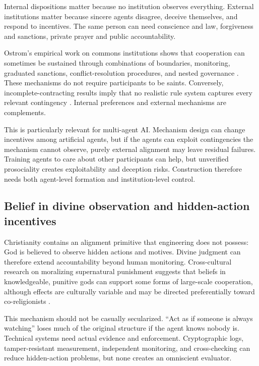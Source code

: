 \documentclass[11pt]{article}
\begin{document}
Internal dispositions matter because no institution observes everything. External institutions matter because sincere agents disagree, deceive themselves, and respond to incentives. The same person can need conscience and law, forgiveness and sanctions, private prayer and public accountability.

Ostrom's empirical work on commons institutions shows that cooperation can sometimes be sustained through combinations of boundaries, monitoring, graduated sanctions, conflict-resolution procedures, and nested governance \parencite{ostrom1990commons}. These mechanisms do not require participants to be saints. Conversely, incomplete-contracting results imply that no realistic rule system captures every relevant contingency \parencite{hadfieldmenell2019incomplete,huang2026mechanism}. Internal preferences and external mechanisms are complements.

This is particularly relevant for multi-agent AI. Mechanism design can change incentives among artificial agents, but if the agents can exploit contingencies the mechanism cannot observe, purely external alignment may leave residual failures. Training agents to care about other participants can help, but unverified prosociality creates exploitability and deception risks. Construction therefore needs both agent-level formation and institution-level control.

\subsection{Belief in divine observation and hidden-action incentives}

Christianity contains an alignment primitive that engineering does not possess: God is believed to observe hidden actions and motives. Divine judgment can therefore extend accountability beyond human monitoring. Cross-cultural research on moralizing supernatural punishment suggests that beliefs in knowledgeable, punitive gods can support some forms of large-scale cooperation, although effects are culturally variable and may be directed preferentially toward co-religionists \parencite{purzycki2016moralistic,norenzayan2016prosocial}.

This mechanism should not be casually secularized. ``Act as if someone is always watching'' loses much of the original structure if the agent knows nobody is. Technical systems need actual evidence and enforcement. Cryptographic logs, tamper-resistant measurement, independent monitoring, and cross-checking can reduce hidden-action problems, but none creates an omniscient evaluator.
\end{document}
